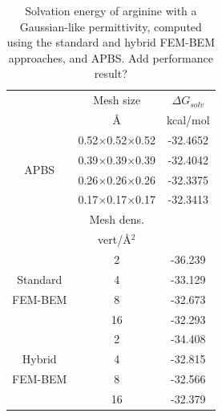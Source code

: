 \begin{table}
\centering
\begin{tabular}{c|c|c}
&Mesh size & $\Delta G_{solv}$\\
&\AA       &  kcal/mol \\
\hline
\multirow{4}{*}{APBS}& 0.52$\times$0.52$\times$0.52 & -32.4652\\ 
& 0.39$\times$0.39$\times$0.39 & -32.4042\\ 
&0.26$\times$0.26$\times$0.26 & -32.3375\\ 
&0.17$\times$0.17$\times$0.17 & -32.3413\\ 
\hline
&Mesh dens. & \\
&vert/\AA$^2$ & \\
\hline
    & 2 & -36.239\\
Standard    & 4  & -33.129 \\
FEM-BEM    & 8  & -32.673 \\
    & 16 & -32.293 \\
\hline
    & 2 & -34.408\\
Hybrid    & 4  & -32.815 \\
FEM-BEM    & 8  & -32.566 \\
    & 16 & -32.379 \\
\hline
\end{tabular}
\caption{Solvation energy of arginine with a Gaussian-like permittivity, computed using the standard and hybrid FEM-BEM approaches, and APBS. Add performance result?}
\label{table:arg_variable}
\end{table}

